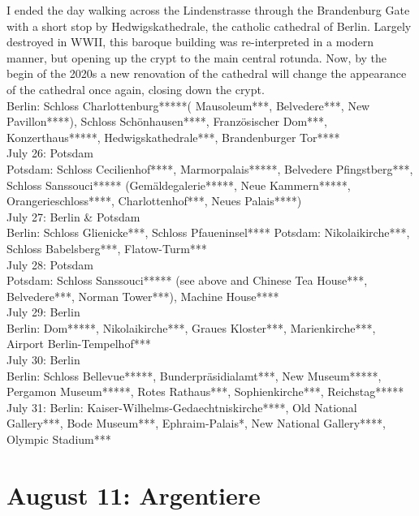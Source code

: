 I ended the day walking across the Lindenstrasse through the Brandenburg Gate with a short stop by Hedwigskathedrale, the catholic cathedral of Berlin. Largely destroyed in WWII, this baroque building was re-interpreted in a modern manner, but opening up the crypt to the main central rotunda. Now, by the begin of the 2020s a new renovation of the cathedral will change the appearance of the cathedral once again, closing down the crypt.\\

Berlin: Schloss Charlottenburg*****( Mausoleum***, Belvedere***, New Pavillon****), Schloss Sch\"onhausen****, Franz\"osischer Dom***, Konzerthaus*****, Hedwigskathedrale***, Brandenburger Tor****\\

July 26: Potsdam\\
Potsdam: Schloss Cecilienhof****, Marmorpalais*****, Belvedere Pfingstberg***, Schloss Sanssouci***** (Gem\"aldegalerie*****, Neue Kammern*****, Orangerieschloss****, Charlottenhof***, Neues Palais****)\\

July 27: Berlin \& Potsdam\\
Berlin: Schloss Glienicke***, Schloss Pfaueninsel****
Potsdam: Nikolaikirche***, Schloss Babelsberg***, Flatow-Turm***\\

July 28: Potsdam\\
Potsdam: Schloss Sanssouci***** (see above and Chinese Tea House***, Belvedere***, Norman Tower***), Machine House****\\

July 29: Berlin\\
Berlin: Dom*****, Nikolaikirche***, Graues Kloster***, Marienkirche***, Airport Berlin-Tempelhof***\\

July 30: Berlin\\
Berlin: Schloss Bellevue*****, Bunderpr\"asidialamt***, New Museum*****, Pergamon Museum*****, Rotes Rathaus***, Sophienkirche***, Reichstag*****\\

July 31:
Berlin: Kaiser-Wilhelms-Gedaechtniskirche****, Old National Gallery***, Bode Museum***, Ephraim-Palais*, New National Gallery****, Olympic Stadium***

\section{August 11: Argentiere}
\label{Argentiere2012}

